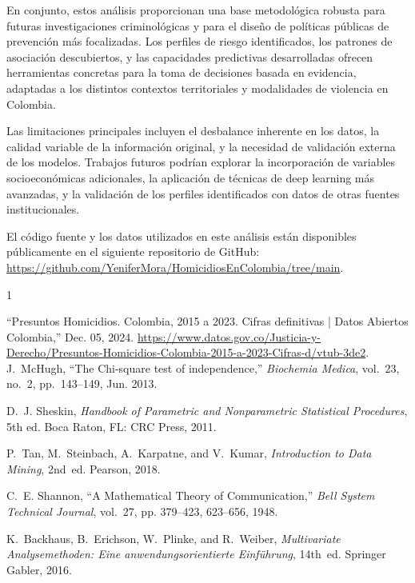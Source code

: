 \documentclass[lettersize,journal]{IEEEtran}
\begin{document}
En conjunto, estos análisis proporcionan una base metodológica robusta para futuras investigaciones criminológicas y para el diseño de políticas públicas de prevención más focalizadas. Los perfiles de riesgo identificados, los patrones de asociación descubiertos, y las capacidades predictivas desarrolladas ofrecen herramientas concretas para la toma de decisiones basada en evidencia, adaptadas a los distintos contextos territoriales y modalidades de violencia en Colombia.

Las limitaciones principales incluyen el desbalance inherente en los datos, la calidad variable de la información original, y la necesidad de validación externa de los modelos. Trabajos futuros podrían explorar la incorporación de variables socioeconómicas adicionales, la aplicación de técnicas de deep learning más avanzadas, y la validación de los perfiles identificados con datos de otras fuentes institucionales.

El código fuente y los datos utilizados en este análisis están disponibles públicamente en el siguiente repositorio de GitHub: \url{https://github.com/YeniferMora/HomicidiosEnColombia/tree/main}.
\begin{thebibliography}{1}


``Presuntos Homicidios. Colombia, 2015 a 2023. Cifras definitivas | Datos Abiertos Colombia,” Dec. 05, 2024. \url{
https://www.datos.gov.co/Justicia-y-Derecho/Presuntos-Homicidios-Colombia-2015-a-2023-Cifras-d/vtub-3de2}.
J.~McHugh, “The Chi-square test of independence,” \emph{Biochemia Medica}, vol.~23, no.~2, pp.~143--149, Jun. 2013.

D.~J. Sheskin, \emph{Handbook of Parametric and Nonparametric Statistical Procedures}, 5th ed. Boca Raton, FL: CRC Press, 2011.

P.~Tan, M.~Steinbach, A.~Karpatne, and V.~Kumar, \emph{Introduction to Data Mining}, 2nd~ed. Pearson, 2018.

C.~E. Shannon, ``A Mathematical Theory of Communication,'' \emph{Bell System Technical Journal}, vol.~27, pp. 379--423, 623--656, 1948.

K.~Backhaus, B.~Erichson, W.~Plinke, and R.~Weiber, \emph{Multivariate Analysemethoden: Eine anwendungsorientierte Einführung}, 14th~ed. Springer Gabler, 2016.


\end{thebibliography}


\newpage



\vfill
\end{document}
